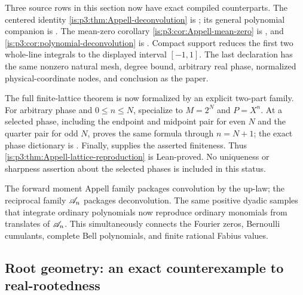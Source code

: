 \begin{statusbox}
Three source rows in this section now have exact compiled counterparts.
The centered identity \cref{is:p3:thm:Appell-deconvolution} is
; its
general polynomial companion is
.
The mean-zero corollary \cref{is:p3:cor:Appell-mean-zero} is
, and
\cref{is:p3:cor:polynomial-deconvolution} is
.
Compact support reduces the first two whole-line integrals to the displayed
interval \([-1,1]\).  The last declaration has the same nonzero natural mesh,
degree bound, arbitrary real phase, normalized physical-coordinate nodes, and
conclusion as the paper.

The full finite-lattice theorem is now formalized by an explicit two-part
family.  For arbitrary phase and $0\le n\le N$, specialize
to $M=2^N$ and $P=X^n$.  At a selected phase, including the endpoint and
midpoint pair for even $N$ and the quarter pair for odd $N$,
proves the same formula through $n=N+1$; the exact phase dictionary is
.  Finally,
 supplies the asserted finiteness.  Thus
\cref{is:p3:thm:Appell-lattice-reproduction} is Lean-proved.  No uniqueness
or sharpness assertion about the selected phases is included in this status.
\end{statusbox}

\begin{resultbox}
The forward moment Appell family packages convolution by the up-law; the reciprocal family $\mathscr A_n$ packages deconvolution.  The same positive dyadic samples that integrate ordinary polynomials now reproduce ordinary monomials from translates of $\mathscr A_n$.  This simultaneously connects the Fourier zeros, Bernoulli cumulants, complete Bell polynomials, and finite rational Fabius values.
\end{resultbox}

\subsection{Root geometry: an exact counterexample to real-rootedness}

